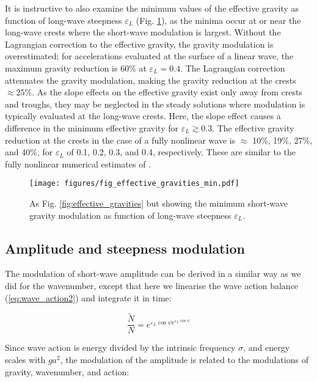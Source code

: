 \documentclass[lineno]{jfm}
\begin{document}
It is instructive to also examine the minimum values of the
effective gravity as function of long-wave steepness $\varepsilon_L$
(Fig. \ref{fig:effective_gravities_min}), as the minima occur at or
near the long-wave crests where the short-wave modulation is largest.
Without the Lagrangian correction to the effective gravity, the gravity
modulation is overestimated; for accelerations evaluated at the surface of a
linear wave, the maximum gravity reduction is 60\% at $\varepsilon_L = 0.4$.
The Lagrangian correction attenuates the gravity modulation, making the
gravity reduction at the crests $\approx 25\%$.
As the slope effects on the effective gravity exist only away from crests and
troughs, they may be neglected in the steady solutions where modulation is
typically evaluated at the long-wave crests.
Here, the slope effect causes a difference in the minimum effective gravity
for $\varepsilon_L \gtrsim 0.3$.
The effective gravity reduction at the crests in the case of a fully nonlinear
wave is $\approx$ 10\%, 19\%, 27\%, and 40\%, 
for $\varepsilon_L$ of 0.1, 0.2, 0.3, and 0.4, respectively.
These are similar to the fully nonlinear numerical estimates of
\citet{longuet1986eulerian,longuet1987propagation}.

\begin{figure}
\centering
\texttt{[image: figures/fig\_effective\_gravities\_min.pdf]}
\caption{
  As Fig. \ref{fig:effective_gravities} but showing the minimum short-wave
  gravity modulation as function of long-wave steepness $\varepsilon_L$.
}
\label{fig:effective_gravities_min}
\end{figure}

\subsection{Amplitude and steepness modulation}
\label{subsection:amplitude_modulation}

The modulation of short-wave amplitude can be derived in a similar way as we did
for the wavenumber, except that here we linearise the wave action balance
(\ref{eq:wave_action2}) and integrate it in time:

\begin{equation}
\label{eq:wave_action_modulation}
\frac{\widetilde{N}}{N} = e^{\varepsilon_L \cos{\psi} e^{\varepsilon_L \cos{\psi}}}
\end{equation}

Since wave action is energy divided by the intrinsic frequency $\sigma$,
and energy scales with $ga^2$, the modulation of the amplitude is related to the
modulations of gravity, wavenumber, and action:
\end{document}

